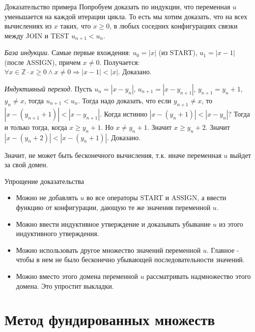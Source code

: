 \documentclass[hyperref={unicode=true}]{beamer}
\begin{document}
    \begin{frame}{Доказательство примера}
    Попробуем доказать по индукции, что переменная $u$ уменьшается на каждой итерации цикла. То есть мы хотим доказать, что на всех вычислениях из $x$ таких, что $x \geq 0$, в любых соседних конфигурациях связки между JOIN и TEST $u_{n+1} < u_n$.

    \emph{База индукции}. Самые первые вхождения: $u_0 = |x|$ (из START), $u_1 = |x - 1|$ (после ASSIGN), причем $x \neq 0$. Получается: $\forall x \in \mathbb{Z} \cdot x \geq 0 \land x \neq 0 \Rightarrow |x - 1| < |x|$. Доказано.

    \emph{Индуктивный переход}. Пусть $u_n = |x - y_n|$, $u_{n+1} = |x - y_{n+1}|$, $y_{n+1} = y_n + 1$, $y_n \neq x$, тогда $u_{n+1} < u_n$. Тогда надо доказать, что если $y_{n+1} \neq x$, то $|x - (y_{n+1} + 1)| < |x - y_{n+1}|$. Когда истинно $|x - (y_n + 1)| < |x - y_n|$? Тогда и только тогда, когда $x \geq y_n + 1$. Но $x \neq y_n + 1$. Значит $x \geq y_n + 2$. Значит $|x - (y_n + 2)| < |x - (y_n + 1)|$. Доказано.

    Значит, не может быть бесконечного вычисления, т.к. иначе переменная $u$ выйдет за свой домен.
    \end{frame}

    \begin{frame}{Упрощение доказательства}
    \begin{itemize}
    \item Можно не добавлять $u$ во все операторы START и ASSIGN, а ввести функцию от конфигурации, дающую те же значения переменной $u$.
    \item Можно ввести индуктивное утверждение и доказывать убывание $u$ из этого индуктивного утверждения.
    \item Можно использовать другое множество значений переменной $u$. Главное - чтобы в нем не было бесконечно убывающей последовательности значений.
    \item Можно вместо этого домена переменной $u$ рассматривать надмножество этого домена. Это упростит выкладки.
    \end{itemize}
    \end{frame}

	\section{Метод фундированных множеств}
\end{document}
